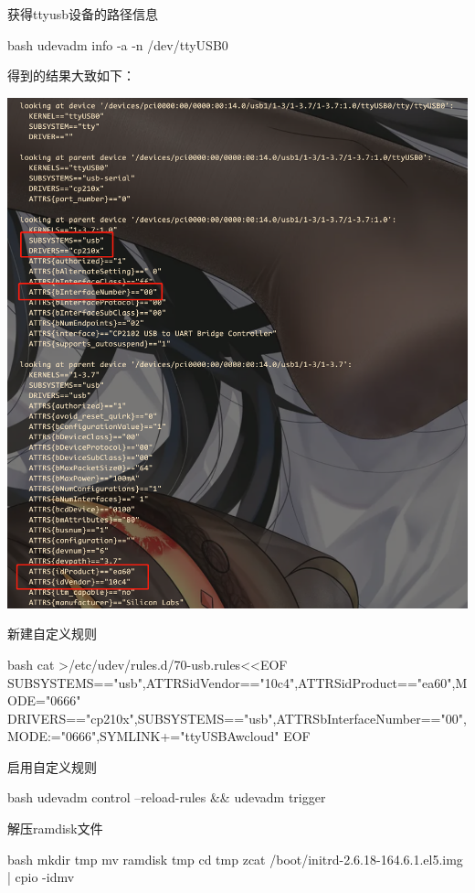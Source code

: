 \begin{outline}[enumerate]
\2 获得ttyusb设备的路径信息
\begin{code-block}{bash}
udevadm info -a -n /dev/ttyUSB0
\end{code-block}
得到的结果大致如下：
\par\begin{minipage}{\linewidth}
  \centering
  \includegraphics[width=\linewidth]{ttyusb_info.png}
  \label{fig:ttyusb_info}
\end{minipage}

\2 新建自定义规则
\begin{code-block}{bash}
cat >/etc/udev/rules.d/70-usb.rules<<EOF
SUBSYSTEMS=="usb",ATTRS{idVendor}=="10c4",ATTRS{idProduct}=="ea60",MODE="0666"
DRIVERS=="cp210x",SUBSYSTEMS=="usb",ATTRS{bInterfaceNumber}=="00",MODE:="0666",SYMLINK+="ttyUSBAwcloud"
EOF
\end{code-block}

\2 启用自定义规则
\begin{code-block}{bash}
udevadm control --reload-rules && udevadm trigger
\end{code-block}

\1 解压ramdisk文件
\begin{code-block}{bash}
mkdir tmp
mv ramdisk tmp
cd tmp
zcat /boot/initrd-2.6.18-164.6.1.el5.img | cpio -idmv
\end{code-block}


\end{outline}

